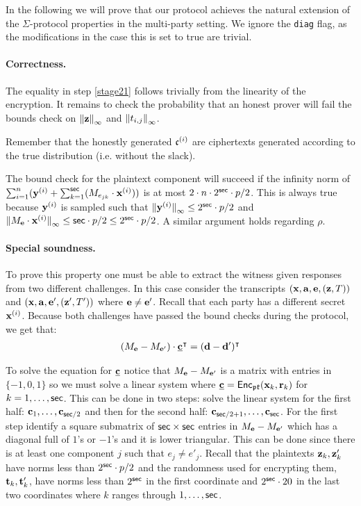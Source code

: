In the following we will prove that our protocol achieves the natural
extension of the $\Sigma$-protocol properties in the multi-party
setting.
We ignore the \verb+diag+ flag, as the modifications in the case
this is set to true are trivial.

\paragraph{Correctness.}
The equality in step \ref{stage21} follows trivially from the linearity of the encryption.
It remains to check the probability that an honest prover will fail the bounds check on ${\Vert \mathbf{z} \Vert}_\infty$ 
and ${\Vert t_{i,j} \Vert}_\infty$.

Remember that the honestly generated $\mathfrak{c}^{(i)}$ are ciphertexts
generated according to the true distribution (i.e. without the slack).

The bound check for the plaintext component will succeed if the 
infinity norm of $\sum_{i=1}^n (\mathbf{y}^{(i)} + \sum_{k=1}^{\mathsf{sec}}(M_{e_{jk}} \cdot
\mathbf{x}^{(i)}))$ is at most $2 \cdot n \cdot 2^{\mathsf{sec}} \cdot p/2$. 
This is always true because $\mathbf{y}^{(i)}$ is sampled such that 
${\Vert \mathbf{y}^{(i)} \Vert}_\infty \leq 2^{\mathsf{sec}} \cdot p/2$ and 
${\Vert M_{\mathbf{e}} \cdot \mathbf{x}^{(i)} \Vert}_\infty \le \mathsf{sec} \cdot p/2 \le 2^{\mathsf{sec}} \cdot p/2$. 
A similar argument holds regarding $\rho$.

\paragraph{Special soundness.} To prove this property one must be able to extract the witness given responses from 
two different challenges. 
In this case consider the transcripts $(\mathbf{x}, \mathbf{a}, \mathbf{e}, (\mathbf{z}, T))$ and $(\mathbf{x}, \mathbf{a}, \mathbf{e}', (\mathbf{z}', T'))$ where $\mathbf{e} \neq \mathbf{e}'$. 
Recall that each party has a different secret $\mathbf{x}^{(i)}$. 
Because both challenges have passed the bound checks during the protocol, we get that:
\begin{align*}
    (M_{\mathbf{e}} - M_{\mathbf{e}'}) \cdot \underline{\mathbf{c}}^{\intercal} = (\mathbf{d} - \mathbf{d}')^{\intercal}
\end{align*}

To solve the equation for $\underline{\mathbf{c}}$ notice that $M_{\mathbf{e}} - M_{\mathbf{e}'}$ is a matrix with entries in $\{-1,0,1\}$ so we 
must solve a linear system where $\underline{\mathbf{c}} = \mathsf{Enc}_{\mathfrak{pk}}(\mathbf{x}_k, \mathbf{r}_k)$ for $k = 1,\dots,\mathsf{sec}$. 
This can be done in two steps: solve the linear system for the first half: $\mathbf{c}_1, \dots, \mathbf{c}_{\mathsf{sec}/2}$ and 
then for the second half: $\mathbf{c}_{\mathsf{sec}/2+1}, \dots, \mathbf{c}_{\mathsf{sec}}$. 
For the first step identify a square submatrix of $\mathsf{sec} \times \mathsf{sec}$ entries in $M_{\mathbf{e}} - M_{\mathbf{e}'}$ which 
has a diagonal full of $1$'s or $-1$'s and it is lower triangular. 
This can be done since there is at least one component $j$ such that $e_j \neq e'_j$. 
Recall that the plaintexts $\mathbf{z}_k, \mathbf{z}'_k$ have norms less than $2^{\mathsf{sec}} \cdot p/2$ and 
the randomness used for encrypting them, $\mathbf{t}_k, \mathbf{t}'_k$, have norms less than 
$2^{\mathsf{sec}}$ in the first coordinate and $2^{\mathsf{sec}} \cdot 20$ in the last two coordinates where $k$ ranges 
through $1, \dots, \mathsf{sec}$.

